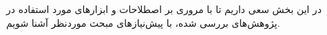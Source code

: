 \label{literature}
در این بخش سعی داریم تا با مروری بر اصطلاحات و ابزارهای مورد استفاده در پژوهش‌های بررسی شده، با پیش‌نیازهای مبحث موردنظر آشنا شویم. 
